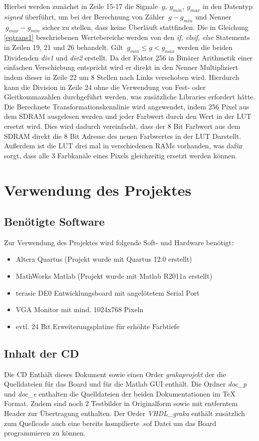 \documentclass[%
  paper=A4, %
  pagesize, %
  12pt,
  ngerman   %
]{scrreprt}  %
\begin{document}
Hierbei werden zunächst in Zeile 15-17 die Signale $\ g,\:g_{min},\:g_{max}$ in den Datentyp \emph{signed} überführt, um bei der Berechnung von Zähler $\ g-g_{min} $ und Nenner $\ g_{max} - g_{min} $ sicher zu stellen, dass keine Überläuft stattfinden. Die in Gleichung \ref{eqtrans1} beschriebenen Wertebereiche werden von den \emph{if, elsif, else} Statements in Zeilen 19, 21 und 26 behandelt. Gilt  $\ g_{min} \leq g < g_{max}$ werden die beiden Dividenden \emph{div1} und \emph{div2} erstellt. Da der Faktor 256 in Binärer Arithmetik einer einfachen Verschiebung entspricht wird er direkt in den Nenner Multipliziert indem dieser in Zeile 22 um 8 Stellen nach Links verschoben wird. Hierdurch kann die Division in Zeile 24 ohne die Verwendung von Fest- oder Gleitkommazahlen durchgeführt werden, was zusätzliche Libraries erfordert hätte.\\
Die Berechnete Transformationskennlinie wird angewendet, indem  256 Pixel aus dem SDRAM ausgelesen werden und jeder Farbwert durch den Wert in der LUT ersetzt wird. Dies wird dadurch vereinfacht, dass der 8 Bit Farbwert aus dem SDRAM direkt die 8 Bit Adresse des neuen Farbwertes in der LUT Darstellt. Außerdem ist die LUT drei mal in verschiedenen RAMs vorhanden, was dafür sorgt, dass alle 3 Farbkanäle eines Pixels gleichzeitig ersetzt werden können.

\chapter{Verwendung des Projektes}
\section{Benötigte Software}
Zur Verwendung des Projektes wird folgende Soft- und Hardware benötigt:
\begin{itemize}
\item Altera Quartus (Projekt wurde mit Quartus 12.0 erstellt)
\item MathWorks Matlab (Projekt wurde mit Matlab R2011a erstellt)
\item terasic DE0 Entwicklungsboard mit angelötetem Serial Port
\item VGA Monitor mit mind. 1024x768 Pixeln
\item evtl. 24 Bit Erweiterungsplatine für erhöhte Farbtiefe
\end{itemize}

\section{Inhalt der CD}
Die CD Enthält dieses Dokument sowie einen Order \emph{graka\-projekt} der die Quelldateien für das Board und für die Matlab GUI enthält. Die Ordner \emph{doc\_p} und \emph{doc\_e} enthalten die Quelldateien der beiden Dokumentationen im \TeX{} Format. Zudem sind noch 2 Testbilder in Originalform sowie mit entferntem Header zur Übertragung enthalten. Der Order \emph{VHDL\_graka} enthält zusätzlich zum Quellcode auch eine bereits kompilierte .sof Datei um das Board programmieren zu können.
\end{document}
